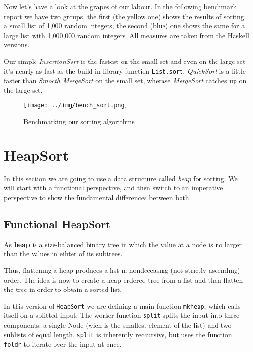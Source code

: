 Now let's have a look at the grapes of our labour.
In the following benchmark report we have two groups, the first (the yellow one) shows the results of sorting a small list of 1,000 random integers, the second (blue) one shows the same for a large list with 1,000,000 random integers. All measures are taken from the Haskell versions.

Our simple \emph{InsertionSort} is the fastest on the small set and even on the large set it's nearly as fast as the build-in library function \texttt{List.sort}.
\emph{QuickSort} is a little faster than \emph{Smooth MergeSort} on the small set, wherase \emph{MergeSort} catches up on the large set.

\begin{figure}[h]
\centering
\texttt{[image: ../img/bench\_sort.png]}
\caption[Sorting benchmarks]{Benchmarking our sorting algorithms}
\end{figure}

\section{HeapSort}

In this section we are going to use a data structure called \emph{heap} for sorting. We will start with a functional perspective, and then switch to an imperative perspective to show the fundamental differences between both.

\subsection{Functional HeapSort}

\begin{defn}[Heap]
As \textbf{heap} is a size-balanced binary tree in which the value at a node is no larger than the values in eihter of its subtrees.
\end{defn}

Thus, flattening a heap produces a list in nondeceasing (not strictly ascending) order.
The idea is now to create a heap-ordered tree from a list and then flatten the tree in order to obtain a sorted list.

\begin{impl}
In this version of \texttt{HeapSort} we are defining a main function \texttt{mkheap}, which calls itself on a splitted input.
The worker function \texttt{split} splits the input into three components: a single Node (wich is the smallest element of the list) and two sublists of equal length.
\texttt{split} is inherently reccursive, but uses the function \texttt{foldr} to iterate over the input at once.
\end{impl}

